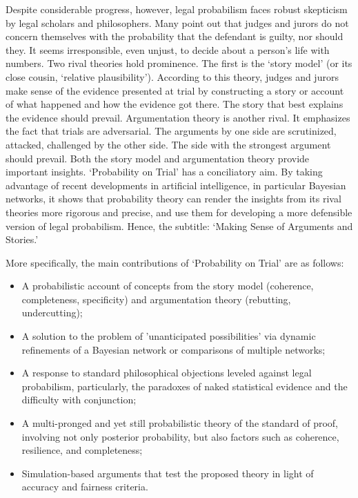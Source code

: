 \documentclass[
  10pt,
  dvipsnames,enabledeprecatedfontcommands]{scrartcl}
\begin{document}
Despite considerable progress, however, legal probabilism faces robust
skepticism by legal scholars and philosophers. Many point out that
judges and jurors do not concern themselves with the probability that
the defendant is guilty, nor should they. It seems irresponsible, even
unjust, to decide about a person's life with numbers. Two rival theories
hold prominence. The first is the `story model' (or its close cousin,
`relative plausibility'). According to this theory, judges and jurors
make sense of the evidence presented at trial by constructing a story or
account of what happened and how the evidence got there. The story that
best explains the evidence should prevail. Argumentation theory is
another rival. It emphasizes the fact that trials are adversarial. The
arguments by one side are scrutinized, attacked, challenged by the other
side. The side with the strongest argument should prevail. Both the
story model and argumentation theory provide important insights.
`Probability on Trial' has a conciliatory aim. By taking advantage of
recent developments in artificial intelligence, in particular Bayesian
networks, it shows that probability theory can render the insights from
its rival theories more rigorous and precise, and use them for
developing a more defensible version of legal probabilism. Hence, the
subtitle: `Making Sense of Arguments and Stories.'

More specifically, the main contributions of `Probability on Trial' are
as follows:

\begin{itemize}
\item A probabilistic account of concepts from the story model (coherence, completeness, specificity) and argumentation theory (rebutting, undercutting);
\item A solution to the problem of 'unanticipated possibilities'  via dynamic refinements of a Bayesian network or comparisons of multiple networks;
\item A response to standard philosophical objections leveled against legal probabilism, particularly, the paradoxes of naked statistical evidence and the difficulty with conjunction; 
\item A multi-pronged and yet still probabilistic theory of the standard of proof, involving not only posterior probability, but also  factors such as  coherence, resilience, and completeness;
\item Simulation-based arguments that test the proposed theory in light of accuracy and fairness criteria.
\end{itemize}
\end{document}
